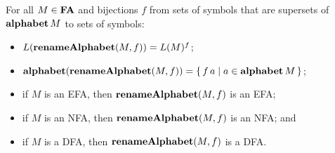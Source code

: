 \begin{theorem}
For all $M\in\mathbf{FA}$ and bijections $f$ from sets of symbols that
are supersets of $\mathbf{alphabet}\,M$ to sets of symbols:
\begin{itemize}
\item $L(\mathbf{renameAlphabet}(M,f)) = L(M)^f$;

\item $\mathbf{alphabet}(\mathbf{renameAlphabet}(M,f)) =
\{ \, f\,a \mid a\in\mathbf{alphabet}\,M \, \}$;

\item if $M$ is an EFA, then $\mathbf{renameAlphabet}(M,f)$ is an EFA;

\item if $M$ is an NFA, then $\mathbf{renameAlphabet}(M,f)$ is an NFA; and

\item if $M$ is a DFA, then $\mathbf{renameAlphabet}(M,f)$ is a DFA.
\end{itemize}
\end{theorem}

